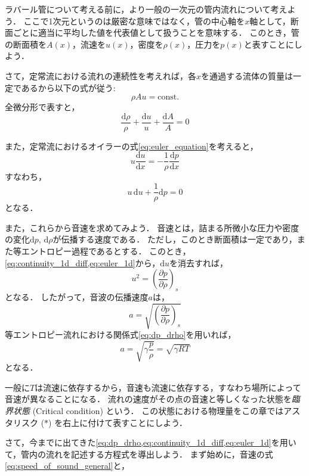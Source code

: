 \documentclass[uplatex,dvipdfmx,a4j,11pt]{jsreport}
\newcommand{\diff}{\mathrm{d}} %
\numberwithin{equation}{chapter}
\begin{document}
\enskip

ラバール管について考える前に，より一般の一次元の管内流れについて考えよう．
ここで1次元というのは厳密な意味ではなく，管の中心軸を$x$軸として，断面ごとに適当に平均した値を代表値として扱うことを意味する．
このとき，管の断面積を$A(x)$，流速を$u(x)$，密度を$\rho(x)$，圧力を$p(x)$と表すことにしよう．

さて，定常流における流れの連続性を考えれば，各$x$を通過する流体の質量は一定であるから以下の式が従う:
\begin{equation}
  \rho A u = \text{const.}
  \label{eq:continuity_1d}
\end{equation}
全微分形で表すと，
\begin{equation}
  \frac{\diff \rho}{\rho} + \frac{\diff u}{u} + \frac{\diff A}{A} = 0
  \label{eq:continuity_1d_diff}
\end{equation}

また，定常流におけるオイラーの式\ref{eq:euler_equation}を考えると，
\begin{equation*}
  u\frac{\diff u}{\diff x} = - \frac{1}{\rho} \frac{\diff p}{\diff x}
\end{equation*}
すなわち，
\begin{equation}
  u \, \diff u + \frac{1}{\rho} \diff p = 0
  \label{eq:euler_1d}
\end{equation}
となる．

また，これらから音速を求めてみよう．
音速とは，詰まる所微小な圧力や密度の変化$\diff p$, $\diff \rho$が伝播する速度である．
ただし，このとき断面積は一定であり，また等エントロピー過程であるとする．
このとき，\cref{eq:continuity_1d_diff,eq:euler_1d}から，$\diff u$を消去すれば，
\begin{equation*}
  u^2 = \left(\frac{\partial p}{\partial \rho}\right)_s
\end{equation*}
となる．
したがって，音波の伝播速度$a$は，
\begin{equation}
  a = \sqrt{\left(\frac{\partial p}{\partial \rho}\right)_s}
  \label{eq:speed_of_sound_general}
\end{equation}
等エントロピー流れにおける関係式\ref{eq:dp_drho}を用いれば，
\begin{equation}
  a = \sqrt{\gamma \frac{p}{\rho}} = \sqrt{\gamma RT}
  \label{eq:speed_of_sound_ideal_gas}
\end{equation}
となる．

一般に$T$は流速に依存するから，音速も流速に依存する，すなわち場所によって音速が異なることになる．
流れの速度がその点の音速と等しくなった状態を\emph{臨界状態} (Critical condition) という．
この状態における物理量をこの章ではアスタリスク ($*$) を右上に付けて表すことにしよう．


\enskip

さて，今までに出てきた\cref{eq:dp_drho,eq:continuity_1d_diff,eq:euler_1d}を用いて，管内の流れを記述する方程式を導出しよう．
まず始めに，音速の式\cref{eq:speed_of_sound_general}と，




\end{document}
